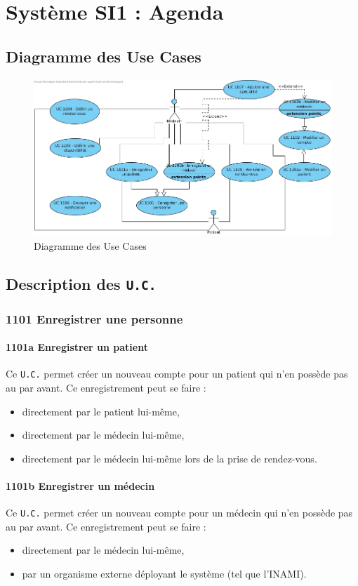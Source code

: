 \section{Système SI1 : Agenda}
\subsection{Diagramme des Use Cases}
\begin{figure}[hb]
	\centering
	\includegraphics[scale=0.5]{MCT/SS1_UC.jpg}
	\caption{Diagramme des Use Cases}
	\label{fig:ss1_uc}
\end{figure}
\subsection{Description des \texttt{U.C.}}
\subsubsection{1101 Enregistrer une personne}
\paragraph{1101a Enregistrer un patient}
Ce \texttt{U.C.} permet créer un nouveau compte pour un patient qui n'en possède pas au
par avant. Ce enregistrement peut se faire :
\begin{itemize}
	\item directement par le patient lui-même,
	\item directement par le médecin lui-même,
	\item directement par le médecin lui-même lors de la prise de rendez-vous.
\end{itemize}
\paragraph{1101b Enregistrer un médecin}
Ce \texttt{U.C.} permet créer un nouveau compte pour un médecin qui n'en possède pas au
par avant. Ce enregistrement peut se faire :
\begin{itemize}
	\item directement par le médecin lui-même,
	\item par un organisme externe déployant le système (tel que l'INAMI).
\end{itemize}

